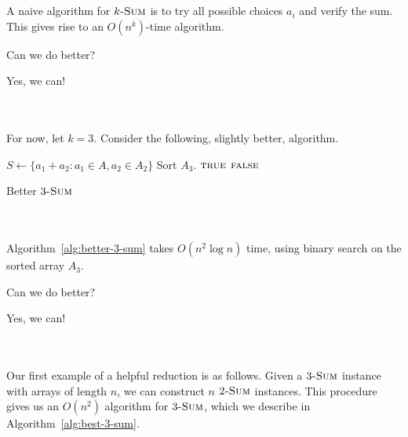         \vphantom
        \\
        \\
        A naive algorithm for \(k\textsc{-Sum}\) is to try all possible choices \(a_i\) and verify the sum. This gives rise to an \(O(n^k)\)-time algorithm.
        \begin{question*}
            Can we do better?
        \end{question*}
        \begin{answer*}
            Yes, we can!
        \end{answer*} 
        \vphantom
        \\
        \\
        For now, let \(k=3\). Consider the following, slightly better, algorithm.
        \begin{algorithm}[H] 
            \begin{algorithmic}[1]
                    \State \(S\gets \{a_1+a_2:a_1\in A,a_2\in A_2\}\) 
                    \State Sort \(A_3\). 
                     
                         \Return \(\textsc{true}\) 
                        \EndIf
                    \EndFor
                    \State \Return \(\textsc{false}\)
                \EndProcedure 
            \end{algorithmic}
            \caption{Better \(3\textsc{-Sum}\)}
            \label{alg:better-3-sum}
        \end{algorithm}
        \vphantom
        \\
        \\
        Algorithm~\ref{alg:better-3-sum} takes \(O(n^2\log n)\) time, using binary search on the sorted array \(A_3\).
        \pagebreak
        \begin{question*}
            Can we do better?
        \end{question*}
        \begin{answer*}
            Yes, we can!
        \end{answer*} 
        \vphantom
        \\
        \\
        Our first example of a helpful reduction is as follows. Given a \(3\textsc{-Sum}\) instance with arrays of length \(n\), we can construct \(n\) \(2\textsc{-Sum}\) instances. This procedure gives us an \(O(n^2)\) algorithm for \(3\textsc{-Sum}\), which we describe in Algorithm~\ref{alg:best-3-sum}.
